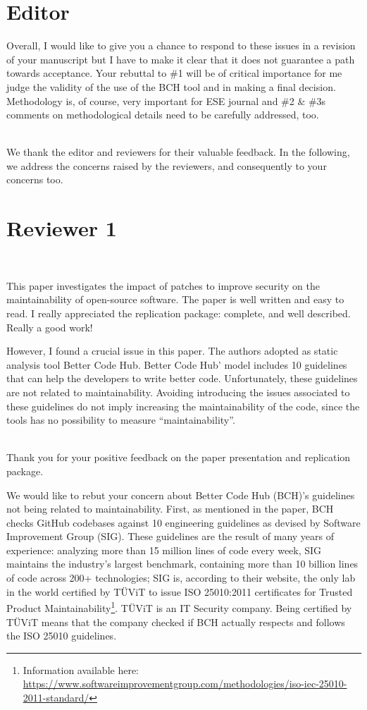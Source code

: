 \documentclass[11pt,fleqn]{article}
\title{\vspace*{-2cm}{\bf Authors' Response to the Review of
 EMSE-D-20-00300:\\
 ``Fixing Vulnerabilities Potentially Hinders Maintainability''}}
\author{Sofia Reis, Rui Abreu, Luis Cruz}
\date{}
\newcommand{\eline}{\vspace*{.75\baselineskip}}
\newcommand{\Referee}[1]{\eline \noindent {\bf Reviewer comment #1:} \\}
\newcommand{\Us}{\eline \noindent {\bf Response:}\\}
\newcommand{\newreviewer}[1]{\section*{Reviewer #1}\vspace*{-1.05\baselineskip}}
\newcommand{\editor}[1]{\section*{Editor #1}\vspace*{-1.05\baselineskip}}
\newenvironment{revcomment}[1][]
{\Referee{#1}\begin{rcomment}}
{\end{rcomment}}
\newenvironment{reveditor}
{\begin{rcomment}}
{\end{rcomment}}
\begin{document}
\maketitle

\editor{}

\begin{reveditor}
    Overall, I would like to give you a chance to respond to 
    these issues in a revision of your manuscript but I have 
    to make it clear that it does not guarantee a path towards 
    acceptance. Your rebuttal to \#1 will be of critical importance 
    for me judge the validity of the use of the BCH tool and in 
    making a final decision. Methodology is, of course, very 
    important for ESE journal and \#2 \& \#3s comments on methodological 
    details need to be carefully addressed, too. 
\end{reveditor}

\Us We thank the editor and reviewers for their valuable feedback. In the 
following, we address the concerns raised by the reviewers, and consequently 
to your concerns too.

\newreviewer{1}

\begin{revcomment}[1.1]

    This paper investigates the impact of patches to improve 
    security on the maintainability of open-source software. 
    The paper is well written and easy to read. I really 
    appreciated the replication package: complete, and well 
    described. Really a good work!
    
    However, I found a crucial issue in this paper. The authors 
    adopted as static analysis tool Better Code Hub. Better Code 
    Hub' model includes 10 guidelines that can help the developers to 
    write better code. Unfortunately, these guidelines are not related 
    to maintainability. Avoiding introducing the issues associated to 
    these guidelines do not imply increasing the maintainability of the 
    code, since the tools has no possibility to measure ``maintainability''.

\end{revcomment}

\Us Thank you for your positive feedback on the paper presentation and replication
package. 

We would like to rebut your concern about Better Code Hub (BCH)'s guidelines not 
being related to maintainability. First, as mentioned in the paper, BCH checks GitHub 
codebases against 10 engineering guidelines as devised by Software Improvement Group 
(SIG). These guidelines are the result of many years of experience: analyzing more 
than 15 million lines of code every week, SIG maintains the industry’s largest 
benchmark, containing more than 10 billion lines of code across 200+ technologies; SIG 
is, according to their website, the only lab in the world certified by TÜViT to issue ISO 25010:2011 
certificates for Trusted Product Maintainability\footnote{Information available here: 
\url{https://www.softwareimprovementgroup.com/methodologies/iso-iec-25010-2011-standard/}}.
TÜViT is an IT Security company. Being certified by TÜViT means 
that the company checked if BCH actually respects and follows the ISO 25010 guidelines.   
\end{document}
